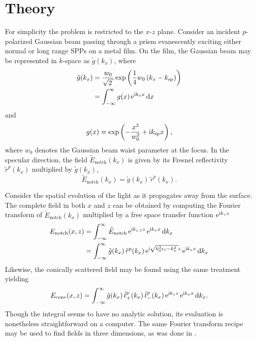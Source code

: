 \section{Theory}\label{sec:interferencetheory}
For simplicity the problem is restricted to the $x$-$z$ plane.  Consider an
incident $p$-polarized Gaussian beam passing through a prism evanescently
exciting either normal or long range SPPs on a metal film.  On the film,
the Gaussian beam may be represented in $k$-space as $\tilde{g}(k_x)$,
where
\begin{align}
\tilde{g}(k_x) &= \frac{w_0}{\sqrt{2}} \exp\left(\frac{1}{4}w_0\left(k_x - \ksp\right)\right)\\
&= \intinfty g(x)\, \me^{\mi k_x x} \md x
\end{align}
and
\begin{equation}
g(x) = \exp\left(-\frac{x^2}{w_0^2} + {\mathrm{i}} k_\mathrm{sp} x\right),
\end{equation}
where $w_0$ denotes the Gaussian beam waist parameter at the focus.  In the
specular direction, the field $\tilde{E}_\mathrm{notch}(k_x)$ is given by its
Fresnel reflectivity $\tilde{r}^p(k_x)$ multiplied by $\tilde{g}(k_x)$,
\begin{equation}
\tilde{E}_\mathrm{notch}(k_x)=\tilde{g}(k_x)\,\tilde{r}^p(k_x).
\end{equation}

Consider the spatial evolution of the light as it propagates
away from the surface.
The complete field in both $x$ and $z$ can be obtained by computing
the Fourier transform of $\tilde{E}_\mathrm{notch}(k_x)$ multiplied 
by a free space transfer function ${\mathrm{e}}^{{\mathrm{i}} k_{z} z}$
\begin{align}
E_\mathrm{notch}(x,z) &= \intinfty \tilde{E}_\mathrm{notch}\, \me^{\mi k_{z,1} z}\, \me^{\mi k_x x} \md k_x\\
 &= \intinfty \tilde{g}(k_x)\, \tilde{r}^p(k_x)\, \me^{\mi \sqrt{k_0^2 \epsilon_1 - k_x^2}z}\, \me^{\mi k_x x} \md k_x
\label{eqn:fourier123}
\end{align}
Likewise, the conically scattered field may be found using the same
treatment yielding
\begin{align}
E_\text{cone}(x,z) = \int_{-\infty}^{\infty} \tilde{g}(k_x)\, 
\tilde{t}^p_+(k_x)\, \tilde{t}^p_-(k_x)\,{\mathrm{e}}^{{\mathrm{i}} k_z z}\, {\mathrm{e}}^{{\mathrm{i}} k_x x}
\,\mathrm{d} k_x.
\label{eqn:fourier321}
\end{align}
Though the integral seems to have no analytic solution, its evaluation is
nonetheless straightforward on a computer.  The same Fourier transform
recipe may be used to find fields in three dimensions, as was done in
.

